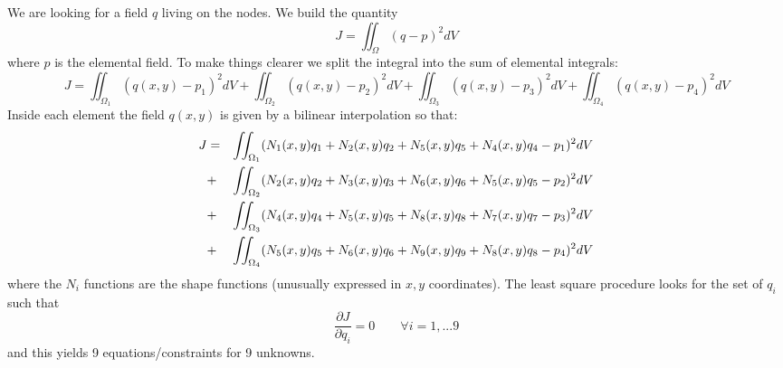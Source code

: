 We are looking for a field $q$ living on the nodes.
We build the quantity
\[
J=\iint_\Omega (q-p)^2 dV
\]
where $p$ is the elemental field. To make things clearer we split the integral into 
the sum of elemental integrals:
\[
J=
\iint_{\Omega_1} (q(x,y)-p_1)^2 dV+
\iint_{\Omega_2} (q(x,y)-p_2)^2 dV+
\iint_{\Omega_3} (q(x,y)-p_3)^2 dV+
\iint_{\Omega_4} (q(x,y)-p_4)^2 dV
\]
Inside each element the field $q(x,y)$ is given by a bilinear interpolation so that:
\begin{eqnarray}
J
&=& \iint_{\Omega_1} (N_1(x,y) q_1 + N_2(x,y)q_2 + N_5(x,y)q_5 + N_4(x,y)q_4 -p_1)^2 dV \nonumber\\
&+& \iint_{\Omega_2} (N_2(x,y) q_2 + N_3(x,y)q_3 + N_6(x,y)q_6 + N_5(x,y)q_5 -p_2)^2 dV \nonumber\\
&+& \iint_{\Omega_3} (N_4(x,y) q_4 + N_5(x,y)q_5 + N_8(x,y)q_8 + N_7(x,y)q_7 -p_3)^2 dV \nonumber\\
&+& \iint_{\Omega_4} (N_5(x,y) q_5 + N_6(x,y)q_6 + N_9(x,y)q_9 + N_8(x,y)q_8 -p_4)^2 dV 
\end{eqnarray}
where the $N_i$ functions are the shape functions (unusually expressed in $x,y$ coordinates).
The least square procedure looks for the set of $q_i$ such that 
\[
\frac{\partial J}{\partial q_i} =0 \qquad \forall i=1,...9
\]
and this yields 9 equations/constraints for 9 unknowns.
